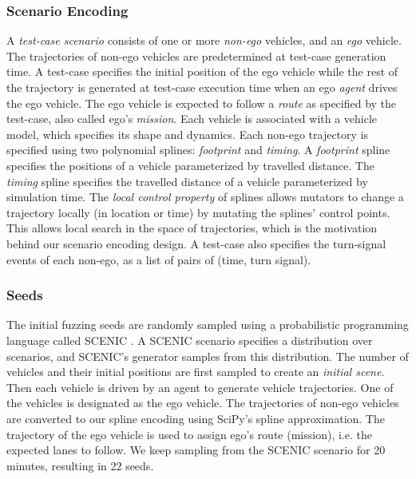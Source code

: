 \subsubsection{Scenario Encoding}
A \emph{test-case scenario} consists of one or more \emph{non-ego} vehicles, and an \emph{ego} vehicle.
%
The trajectories of non-ego vehicles are predetermined at test-case generation time.
%
A test-case specifies the initial position of the ego vehicle while the rest of the trajectory is generated at test-case execution time when an ego \emph{agent} drives the ego vehicle.
%
The ego vehicle is expected to follow a \emph{route} as specified by the test-case, also called ego's \emph{mission}.
%
Each vehicle is associated with a vehicle model, which specifies its shape and dynamics.
%
Each non-ego trajectory is specified using two polynomial splines: \emph{footprint} and \emph{timing}.
%
A \emph{footprint} spline specifies the positions of a vehicle parameterized by travelled distance.
%
The \emph{timing} spline specifies the travelled distance of a vehicle parameterized by simulation time.
%
The \emph{local control property} of splines allows mutators to change a trajectory locally (in location or time) by mutating the splines' control points.
%
This allows local search in the space of trajectories, which is the motivation behind our scenario encoding design.
%
A test-case also specifies the turn-signal events of each non-ego, as a list of pairs of (time, turn signal).


\subsubsection{Seeds}

The initial fuzzing seeds are randomly sampled using a probabilistic programming language called SCENIC \cite{Fremont.2023}.
%
A SCENIC scenario specifies a distribution over scenarios, and SCENIC's generator samples from this distribution.
%
The number of vehicles and their initial positions are first sampled to create an \emph{initial scene}.
%
Then each vehicle is driven by an agent to generate vehicle trajectories.
%
One of the vehicles is designated as the ego vehicle.
%
The trajectories of non-ego vehicles are converted to our spline encoding using SciPy's spline approximation.
%
The trajectory of the ego vehicle is used to assign ego's route (mission), i.e. the expected lanes to follow.
%
We keep sampling from the SCENIC scenario for 20 minutes, resulting in 22 seeds.

